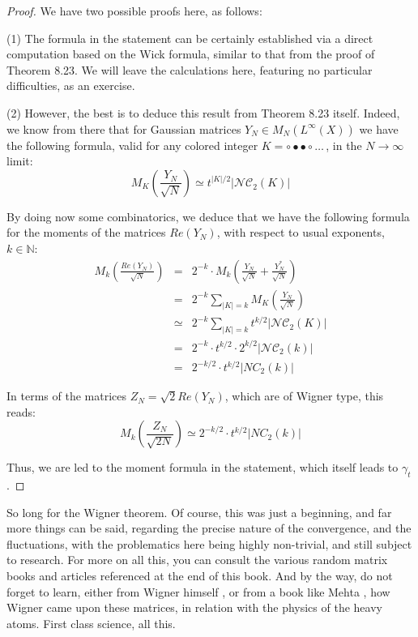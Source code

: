 \documentclass[12pt]{amsbook}
\begin{document}
\begin{proof}
We have two possible proofs here, as follows:

\medskip

(1) The formula in the statement can be certainly established via a direct computation based on the Wick formula, similar to that from the proof of Theorem 8.23. We will leave the calculations here, featuring no particular difficulties, as an exercise.

\medskip

(2) However, the best is to deduce this result from Theorem 8.23 itself. Indeed, we know from there that for Gaussian matrices $Y_N\in M_N(L^\infty(X))$ we have the following formula, valid for any colored integer $K=\circ\bullet\bullet\circ\ldots\,$, in the $N\to\infty$ limit:
$$M_K\left(\frac{Y_N}{\sqrt{N}}\right)\simeq t^{|K|/2}|\mathcal{NC}_2(K)|$$

By doing now some combinatorics, we deduce that we have the following formula for the moments of the matrices $Re(Y_N)$, with respect to usual exponents, $k\in\mathbb N$:
\begin{eqnarray*}
M_k\left(\frac{Re(Y_N)}{\sqrt{N}}\right)
&=&2^{-k}\cdot M_k\left(\frac{Y_N}{\sqrt{N}}+\frac{Y_N^*}{\sqrt{N}}\right)\\
&=&2^{-k}\sum_{|K|=k}M_K\left(\frac{Y_N}{\sqrt{N}}\right)\\
&\simeq&2^{-k}\sum_{|K|=k}t^{k/2}|\mathcal{NC}_2(K)|\\
&=&2^{-k}\cdot t^{k/2}\cdot 2^{k/2}|\mathcal{NC}_2(k)|\\
&=&2^{-k/2}\cdot t^{k/2}|NC_2(k)|
\end{eqnarray*}

In terms of the matrices $Z_N=\sqrt{2}Re(Y_N)$, which are of Wigner type, this reads:
$$M_k\left(\frac{Z_N}{\sqrt{2N}}\right)\simeq 2^{-k/2}\cdot t^{k/2}|NC_2(k)|$$

Thus, we are led to the moment formula in the statement, which itself leads to $\gamma_t$.
\end{proof}

So long for the Wigner theorem. Of course, this was just a beginning, and far more things can be said, regarding the precise nature of the convergence, and the fluctuations, with the problematics here being highly non-trivial, and still subject to research. For more on all this, you can consult the various random matrix books and articles referenced at the end of this book. And by the way, do not forget to learn, either from Wigner himself \cite{wig}, or from a book like Mehta \cite{meh}, how Wigner came upon these matrices, in relation with the physics of the heavy atoms. First class science, all this.
\end{document}
